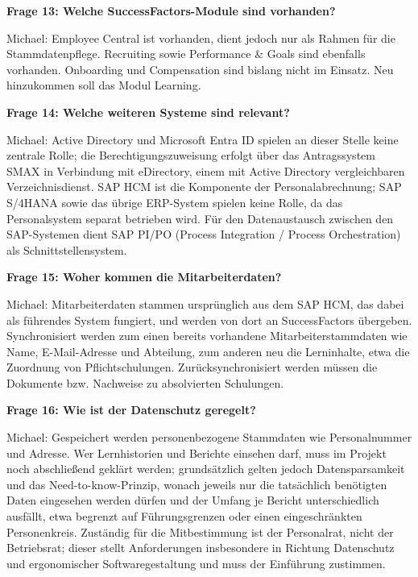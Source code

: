 \documentclass[
    12pt, 
    a4paper,
    ]{scrartcl} %
\begin{document}
\bigskip
{}

\textbf{Frage 13: Welche SuccessFactors-Module sind vorhanden?}

Michael: Employee Central ist vorhanden, dient jedoch nur als Rahmen f\"ur die Stammdatenpflege. Recruiting sowie Performance \& Goals sind ebenfalls vorhanden. Onboarding und Compensation sind bislang nicht im Einsatz. Neu hinzukommen soll das Modul Learning.

\medskip
\textbf{Frage 14: Welche weiteren Systeme sind relevant?}

Michael: Active Directory und Microsoft Entra ID spielen an dieser Stelle keine zentrale Rolle; die Berechtigungszuweisung erfolgt \"uber das Antragssystem SMAX in Verbindung mit eDirectory, einem mit Active Directory vergleichbaren Verzeichnisdienst. SAP HCM ist die Komponente der Personalabrechnung; SAP S/4HANA sowie das \"ubrige ERP-System spielen keine Rolle, da das Personalsystem separat betrieben wird. F\"ur den Datenaustausch zwischen den SAP-Systemen dient SAP PI/PO (Process Integration / Process Orchestration) als Schnittstellensystem.

\medskip
\textbf{Frage 15: Woher kommen die Mitarbeiterdaten?}

Michael: Mitarbeiterdaten stammen urspr\"unglich aus dem SAP HCM, das dabei als f\"uhrendes System fungiert, und werden von dort an SuccessFactors \"ubergeben. Synchronisiert werden zum einen bereits vorhandene Mitarbeiterstammdaten wie Name, E-Mail-Adresse und Abteilung, zum anderen neu die Lerninhalte, etwa die Zuordnung von Pflichtschulungen. Zur\"ucksynchronisiert werden m\"ussen die Dokumente bzw. Nachweise zu absolvierten Schulungen.

\bigskip
{}

\textbf{Frage 16: Wie ist der Datenschutz geregelt?}

Michael: Gespeichert werden personenbezogene Stammdaten wie Personalnummer und Adresse. Wer Lernhistorien und Berichte einsehen darf, muss im Projekt noch abschlie{\ss}end gekl\"art werden; grunds\"atzlich gelten jedoch Datensparsamkeit und das Need-to-know-Prinzip, wonach jeweils nur die tats\"achlich ben\"otigten Daten eingesehen werden d\"urfen und der Umfang je Bericht unterschiedlich ausf\"allt, etwa begrenzt auf F\"uhrungsgrenzen oder einen eingeschr\"ankten Personenkreis. Zust\"andig f\"ur die Mitbestimmung ist der Personalrat, nicht der Betriebsrat; dieser stellt Anforderungen insbesondere in Richtung Datenschutz und ergonomischer Softwaregestaltung und muss der Einf\"uhrung zustimmen.
\end{document}
